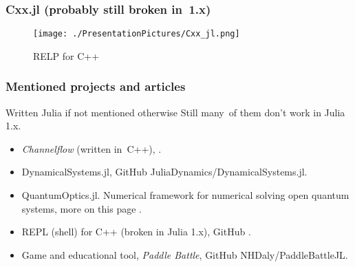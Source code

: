 \documentclass[10pt,t]{beamer}
\begin{document}
\begin{frame}
  \frametitle{Cxx.jl (probably still broken in~1.x)}


  \begin{figure}

    \centering

    \texttt{[image: ./PresentationPictures/Cxx\_jl.png]}


    \caption{RELP for C++}

  \end{figure}

\end{frame}





\begin{frame}
  \frametitle{Mentioned projects and articles}


  {Written Julia if not mentioned otherwise}
  Still many~of them don't work in Julia 1.x.
  \begin{itemize}
    \RaggedRight

  \item \textit{Channelflow} (written in~C++),
    .

  \item DynamicalSystems.jl, GitHub
    {JuliaDynamics/DynamicalSystems.jl}.

  \item QuantumOptics.jl. Numerical framework for numerical
    solving open quantum systems, more on this page
    .

  \item REPL (shell) for C++ (broken in Julia 1.x), GitHub
    .

  \item Game and educational tool, \textit{Paddle Battle}, GitHub
    {NHDaly/PaddleBattleJL}.

  \end{itemize}

\end{frame}






% 







\end{document}
